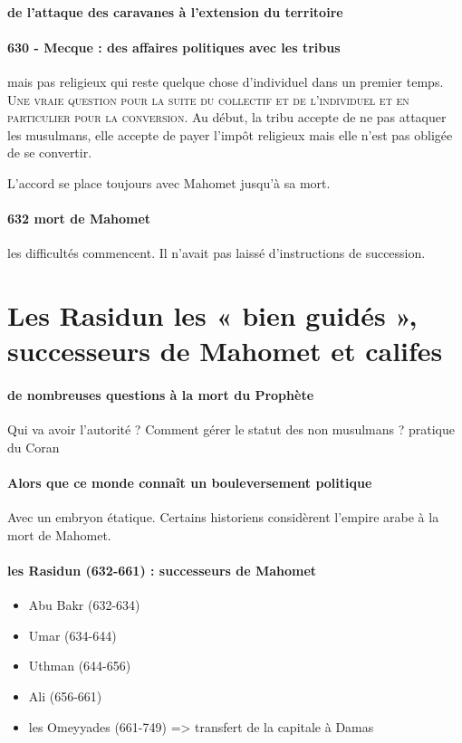 \paragraph{de l'attaque des caravanes à l'extension du territoire} 

\paragraph{630 - Mecque : des affaires politiques avec les tribus} mais pas religieux qui reste quelque chose d'individuel dans un premier temps.  \textsc{Une vraie question pour la suite du collectif et de l'individuel et en particulier pour la conversion. }
Au début, la tribu accepte de ne pas attaquer les musulmans, elle accepte de payer l'impôt religieux mais elle n'est pas obligée de se convertir.

L'accord se place toujours avec Mahomet jusqu'à sa mort.

\paragraph{632 mort de Mahomet} les difficultés commencent.  Il n'avait pas laissé d'instructions de succession. 


\section{Les Rasidun les « bien guidés », successeurs de Mahomet et califes}

 

\paragraph{de nombreuses questions à la mort du Prophète} Qui va avoir l'autorité ? Comment gérer le statut des non musulmans ? pratique du Coran

\paragraph{Alors que ce monde connaît un bouleversement politique} Avec un embryon étatique. Certains historiens considèrent l'empire arabe à la mort de Mahomet.


\paragraph{les Rasidun (632-661) : successeurs de Mahomet}
\begin{itemize}
  \item 	Abu Bakr (632-634)
\item 	Umar (634-644)
\item 	Uthman (644-656)
\item 	Ali (656-661)
\item 	les Omeyyades (661-749) => transfert de la capitale à Damas
\end{itemize}

